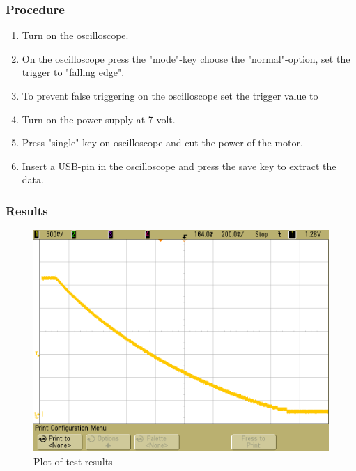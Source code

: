 \subsubsection{Procedure}

\begin{enumerate}
  \item Turn on the oscilloscope.
  \item On the oscilloscope press the "mode"-key choose the "normal"-option, set the trigger to "falling edge".
  \item To prevent false triggering on the oscilloscope set the trigger value to %
  \item Turn on the power supply at 7 volt.
  \item Press "single"-key on oscilloscope and cut the power of the motor.
  \item Insert a USB-pin in the oscilloscope and press the save key to extract the data.
\end{enumerate}

\subsubsection{Results}

\begin{figure}[H]
	\centering
	\includegraphics[scale=.4]{figures/Exercise7}
	\caption{Plot of test results}
\end{figure}